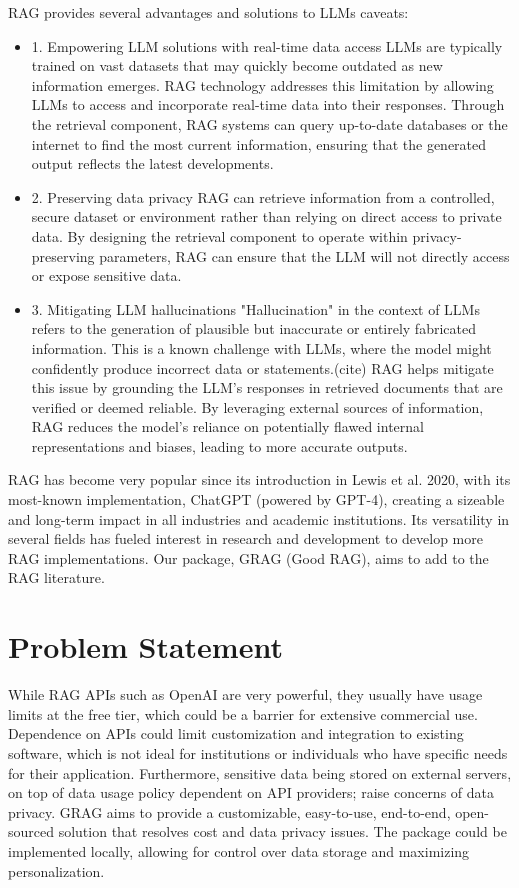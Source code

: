 \documentclass{scrartcl}
\begin{document}
RAG provides several advantages and solutions to LLMs caveats:
\begin{itemize}
	\item 1. Empowering LLM solutions with real-time data access
	LLMs are typically trained on vast datasets that may quickly become outdated as new information emerges. RAG technology addresses this limitation by allowing LLMs to access and incorporate real-time data into their responses. Through the retrieval component, RAG systems can query up-to-date databases or the internet to find the most current information, ensuring that the generated output reflects the latest developments.
	\item 2. Preserving data privacy
	RAG can retrieve information from a controlled, secure dataset or environment rather than relying on direct access to private data. By designing the retrieval component to operate within privacy-preserving parameters, RAG can ensure that the LLM will not directly access or expose sensitive data.
	\item 3. Mitigating LLM hallucinations
	"Hallucination" in the context of LLMs refers to the generation of plausible but inaccurate or entirely fabricated information. This is a known challenge with LLMs, where the model might confidently produce incorrect data or statements.(cite) RAG helps mitigate this issue by grounding the LLM's responses in retrieved documents that are verified or deemed reliable. By leveraging external sources of information, RAG reduces the model's reliance on potentially flawed internal representations and biases, leading to more accurate outputs.
\end{itemize}

RAG has become very popular since its introduction in Lewis et al. 2020, with its most-known implementation, ChatGPT (powered by GPT-4), creating a sizeable and long-term impact in all industries and academic institutions.
Its versatility in several fields has fueled interest in research and development to develop more RAG implementations. Our package, GRAG (Good RAG), aims to add to the RAG literature.

\section{Problem Statement}

While RAG APIs such as OpenAI are very powerful, they usually have usage limits at the free tier, which could be a barrier for extensive commercial use.
Dependence on APIs could limit customization and integration to existing software, which is not ideal for institutions or individuals who have specific needs for their application.
Furthermore, sensitive data being stored on external servers, on top of data usage policy dependent on API providers; raise concerns of data privacy.
GRAG aims to provide a customizable, easy-to-use, end-to-end, open-sourced solution that resolves cost and data privacy issues. The package could be implemented locally, allowing for control over data storage and maximizing personalization.
\end{document}
